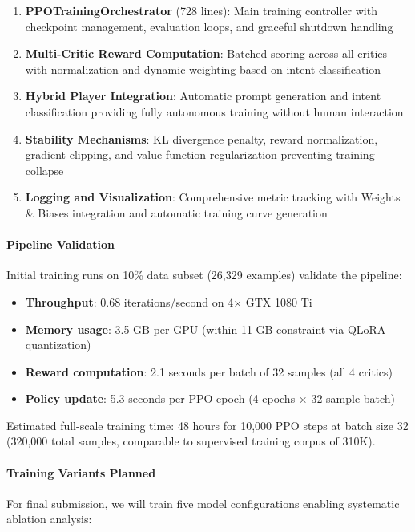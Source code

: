 \documentclass[11pt]{article}
\begin{document}
\begin{enumerate}
    \item \textbf{PPOTrainingOrchestrator} (728 lines): Main training controller with checkpoint management, evaluation loops, and graceful shutdown handling
    \item \textbf{Multi-Critic Reward Computation}: Batched scoring across all critics with normalization and dynamic weighting based on intent classification
    \item \textbf{Hybrid Player Integration}: Automatic prompt generation and intent classification providing fully autonomous training without human interaction
    \item \textbf{Stability Mechanisms}: KL divergence penalty, reward normalization, gradient clipping, and value function regularization preventing training collapse
    \item \textbf{Logging and Visualization}: Comprehensive metric tracking with Weights \& Biases integration and automatic training curve generation
\end{enumerate}

\paragraph{Pipeline Validation}
Initial training runs on 10\% data subset (26,329 examples) validate the pipeline:

\begin{itemize}
    \item \textbf{Throughput}: 0.68 iterations/second on 4$\times$ GTX 1080 Ti
    \item \textbf{Memory usage}: 3.5 GB per GPU (within 11 GB constraint via QLoRA quantization)
    \item \textbf{Reward computation}: 2.1 seconds per batch of 32 samples (all 4 critics)
    \item \textbf{Policy update}: 5.3 seconds per PPO epoch (4 epochs $\times$ 32-sample batch)
\end{itemize}

Estimated full-scale training time: 48 hours for 10,000 PPO steps at batch size 32 (320,000 total samples, comparable to supervised training corpus of 310K).

\paragraph{Training Variants Planned}
For final submission, we will train five model configurations enabling systematic ablation analysis:
\end{document}
